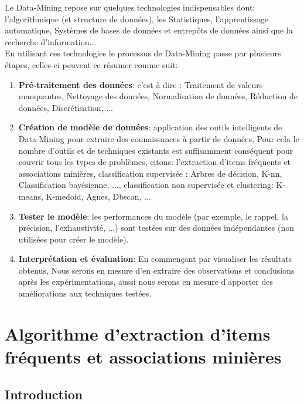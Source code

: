 \documentclass[12pt,a4paper,oneside]{book}
\begin{document}
	
	Le Data-Mining repose sur quelques technologies indispensables dont: l'algorithmique (et structure de données), les Statistiques, l'apprentissage automatique, Systèmes de bases de données et entrepôts de données ainsi que la recherche d'information...\\
	En utilisant ces technologies le processus de Data-Mining passe par plusieurs étapes, celles-ci peuvent ce résumer comme suit:
	\begin{enumerate}
		
		
		\item \textbf{Pré-traitement des données}: c'est à dire :
		Traitement de valeurs manquantes,
		Nettoyage des données,
		Normalisation de données,
		Réduction de données,
		Discrétisation, ...
		
		
		\item \textbf{Création de modèle de données}: application des outils intelligents de Data-Mining pour extraire des connaissances à partir de données, Pour cela le nombre d'outils et de techniques existants est suffisamment conséquent pour couvrir tous les types de problèmes, citons: l'extraction d'items fréquents et associations minières, classification supervisée : Arbres de décision, K-nn, Classification bayésienne, ..., classification non supervisée et clustering: K-means, K-medoid, Agnes, Dbscan, ...
		
		
		\item \textbf{Tester le modèle}: les performances du modèle (par exemple, le rappel, la précision, l'exhaustivité, ...) sont testées sur des données indépendantes (non utilisées pour créer le modèle).
		
		
		\item \textbf{Interprétation et évaluation}: En commençant par visualiser les résultats obtenus, Nous serons en mesure d'en extraire des observations et conclusions après les expérimentations, aussi nous serons en mesure d'apporter des améliorations aux techniques testées.
		
		
		
		
	\end{enumerate}
	\newpage
	
	\chapter{Algorithme d'extraction d'items fréquents et associations minières}
	\section{Introduction}
	
\end{document}

